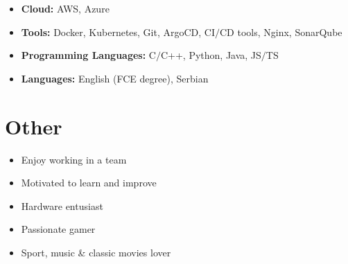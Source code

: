\documentclass[a4paper]{moderncv}
\begin{document}
	\begin{itemize}
		
		\item \textbf{Cloud: } AWS, Azure
		\item \textbf{Tools: } Docker, Kubernetes, Git, ArgoCD, CI$\slash$CD tools, Nginx, SonarQube
		\item \textbf{Programming Languages: } C$\slash$C++, Python, Java, JS$\slash$TS		
		\item \textbf{Languages: } English (FCE degree), Serbian
		
	\end{itemize}
%
%
\section{Other}
	\vspace{-1em}
	\begin{multicols*}{2}
		\begin{itemize}
			\setlength\itemsep{-1.2pt}
			\item Enjoy working in a team
			\item Motivated to learn and improve
			\item Hardware entusiast
			\item Passionate gamer
			\item Sport, music \& classic movies lover
		\end{itemize}		
	\end{multicols*}
	
\end{document}
